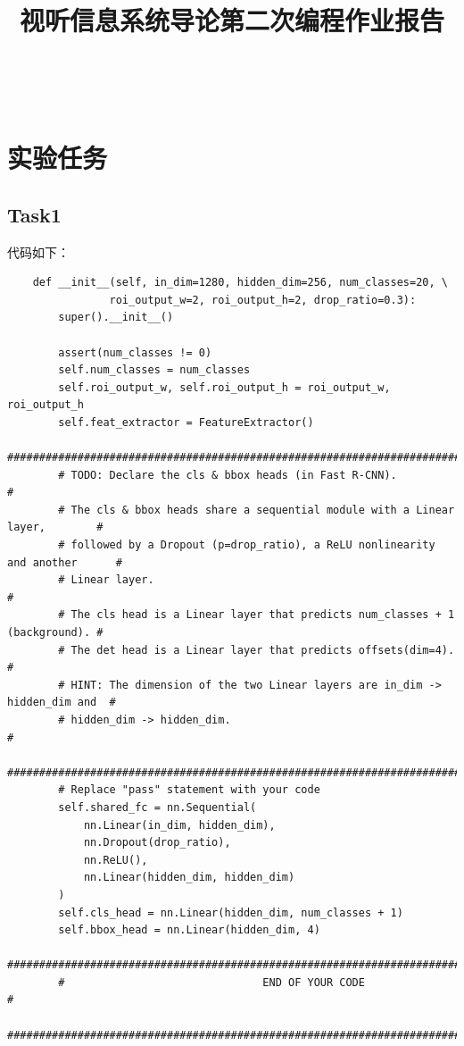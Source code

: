 \documentclass{article}%
\title{视听信息系统导论第二次编程作业报告}
\begin{document}
\begin{titlepage}
    \thispagestyle{empty}
    \vspace*{4cm} %
    \begin{center}
    {\LARGE \textbf{\thetitle}}\\
    \vspace{6cm}
    \end{center}
    \vspace*{\fill} %
\end{titlepage}

\setlength{\baselineskip}{22pt}
\tableofcontents
\clearpage

\section{实验任务}

\subsection{Task1}

代码如下：
\begin{lstlisting}
    def __init__(self, in_dim=1280, hidden_dim=256, num_classes=20, \
                roi_output_w=2, roi_output_h=2, drop_ratio=0.3):
        super().__init__()

        assert(num_classes != 0)
        self.num_classes = num_classes
        self.roi_output_w, self.roi_output_h = roi_output_w, roi_output_h
        self.feat_extractor = FeatureExtractor()
        ##############################################################################
        # TODO: Declare the cls & bbox heads (in Fast R-CNN).                        #
        # The cls & bbox heads share a sequential module with a Linear layer,        #
        # followed by a Dropout (p=drop_ratio), a ReLU nonlinearity and another      #
        # Linear layer.                                                              #
        # The cls head is a Linear layer that predicts num_classes + 1 (background). #
        # The det head is a Linear layer that predicts offsets(dim=4).               #
        # HINT: The dimension of the two Linear layers are in_dim -> hidden_dim and  #
        # hidden_dim -> hidden_dim.                                                  #
        ##############################################################################
        # Replace "pass" statement with your code
        self.shared_fc = nn.Sequential(
            nn.Linear(in_dim, hidden_dim),
            nn.Dropout(drop_ratio),
            nn.ReLU(),
            nn.Linear(hidden_dim, hidden_dim)
        )
        self.cls_head = nn.Linear(hidden_dim, num_classes + 1)
        self.bbox_head = nn.Linear(hidden_dim, 4)
        ##############################################################################
        #                               END OF YOUR CODE                             #
        ##############################################################################
\end{lstlisting}
\end{document}
